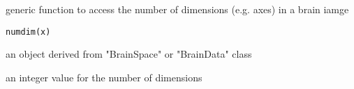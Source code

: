 \begin{Description}\relax
generic function to access the number of dimensions (e.g. axes) in a
brain iamge
\end{Description}
\begin{Usage}
\begin{verbatim}
numdim(x)
\end{verbatim}
\end{Usage}
\begin{Arguments}
\begin{ldescription}
\item[\code{x}] an object derived from "BrainSpace" or "BrainData" class 
\end{ldescription}
\end{Arguments}
\begin{Value}
an integer value for the number of dimensions
\end{Value}


